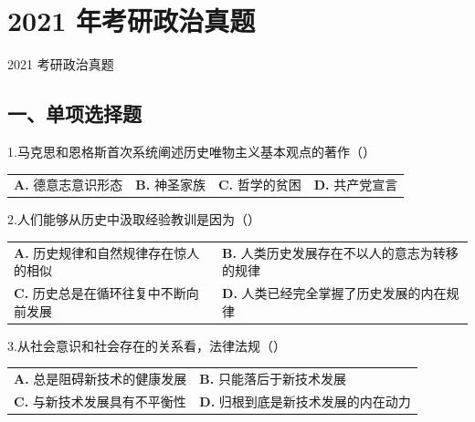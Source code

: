 \documentclass[UTF8,11pt]{ctexart}
\begin{document}
\section*{2021 年考研政治真题}
2021 考研政治真题


\subsection*{一、单项选择题}

1.马克思和恩格斯首次系统阐述历史唯物主义基本观点的著作（）


\begin{center}\begin{tabular}{>{\raggedright\arraybackslash}p{\dimexpr(\linewidth-8\tabcolsep)/4\relax}>{\raggedright\arraybackslash}p{\dimexpr(\linewidth-8\tabcolsep)/4\relax}>{\raggedright\arraybackslash}p{\dimexpr(\linewidth-8\tabcolsep)/4\relax}>{\raggedright\arraybackslash}p{\dimexpr(\linewidth-8\tabcolsep)/4\relax}}
\textbf{A.} 德意志意识形态 & \textbf{B.} 神圣家族 & \textbf{C.} 哲学的贫困 & \textbf{D.} 共产党宣言\\[.35em]\end{tabular}\end{center}

2.人们能够从历史中汲取经验教训是因为（）


\begin{center}\begin{tabular}{>{\raggedright\arraybackslash}p{\dimexpr(\linewidth-4\tabcolsep)/2\relax}>{\raggedright\arraybackslash}p{\dimexpr(\linewidth-4\tabcolsep)/2\relax}}
\textbf{A.} 历史规律和自然规律存在惊人的相似 & \textbf{B.} 人类历史发展存在不以人的意志为转移的规律\\[.35em]
\textbf{C.} 历史总是在循环往复中不断向前发展 & \textbf{D.} 人类已经完全掌握了历史发展的内在规律\\[.35em]\end{tabular}\end{center}

3.从社会意识和社会存在的关系看，法律法规（）


\begin{center}\begin{tabular}{>{\raggedright\arraybackslash}p{\dimexpr(\linewidth-4\tabcolsep)/2\relax}>{\raggedright\arraybackslash}p{\dimexpr(\linewidth-4\tabcolsep)/2\relax}}
\textbf{A.} 总是阻碍新技术的健康发展 & \textbf{B.} 只能落后于新技术发展\\[.35em]
\textbf{C.} 与新技术发展具有不平衡性 & \textbf{D.} 归根到底是新技术发展的内在动力\\[.35em]\end{tabular}\end{center}
\end{document}
